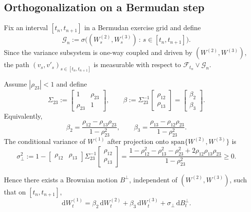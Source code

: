 \documentclass[10pt]{article}
\theoremstyle{plain}
\theoremstyle{definition}
\theoremstyle{remark}
\newcommand{\dd}{\mathrm d}
\begin{document}
\subsection{Orthogonalization on a Bermudan step}



Fix an interval $[t_n,t_{n+1}]$ in a Bermudan exercise grid and define
\[
\mathcal G_n := \sigma\bigl( (W^{(2)}_s,W^{(3)}_s)\,:\,s\in[t_n,t_{n+1}]\bigr).
\]
Since the variance subsystem is one-way coupled and driven by $(W^{(2)},W^{(3)})$, the path
$(v_s,v'_s)_{s\in[t_n,t_{n+1}]}$ is measurable with respect to $\mathcal F_{t_n}\vee\mathcal G_n$.

Assume $|\rho_{23}|<1$ and define
\[
\Sigma_{23}:=
\begin{bmatrix}
1 & \rho_{23}\\
\rho_{23} & 1
\end{bmatrix},
\qquad
\beta:=\Sigma_{23}^{-1}
\begin{bmatrix}
\rho_{12}\\
\rho_{13}
\end{bmatrix}
=
\begin{bmatrix}
\beta_2\\
\beta_3
\end{bmatrix}.
\]
Equivalently,
\begin{equation}\label{eq:proj-coeffs}
\beta_2=\frac{\rho_{12}-\rho_{13}\rho_{23}}{1-\rho_{23}^2},
\qquad
\beta_3=\frac{\rho_{13}-\rho_{12}\rho_{23}}{1-\rho_{23}^2}.
\end{equation}
The conditional variance of $W^{(1)}$ after projection onto $\mathrm{span}\{W^{(2)},W^{(3)}\}$
is
\begin{equation}\label{eq:sigperp}
\sigma_\perp^2
:=1-\begin{bmatrix}\rho_{12}&\rho_{13}\end{bmatrix}\Sigma_{23}^{-1}
\begin{bmatrix}\rho_{12}\\ \rho_{13}\end{bmatrix}
=\frac{1-\rho_{12}^2-\rho_{13}^2-\rho_{23}^2+2\rho_{12}\rho_{13}\rho_{23}}{1-\rho_{23}^2}\ge 0.
\end{equation}


Hence there exists a Brownian motion $B^\perp$, independent of $(W^{(2)},W^{(3)})$, such that
on $[t_n,t_{n+1}]$,
\begin{equation}\label{eq:orth}
\dd W^{(1)}_t=\beta_2\,\dd W^{(2)}_t+\beta_3\,\dd W^{(3)}_t+\sigma_\perp\,\dd B^\perp_t.
\end{equation}
\end{document}
